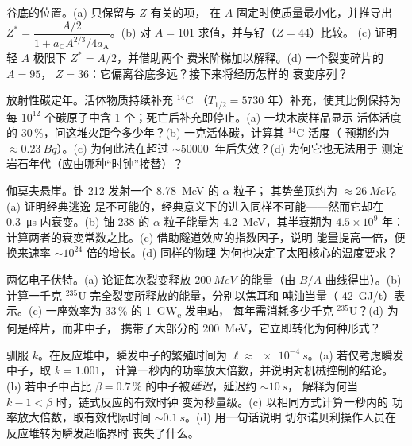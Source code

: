 \begin{exercise}[$\star\star$]\label{exo:b3:nuclear-physics:6}
谷底的位置。(a) 只保留与 $Z$ 有关的项，
在 $A$ 固定时使质量最小化，并推导出
$Z^* = \dfrac{A/2}{1 + a_{\text{C}}A^{2/3}/4a_{\text{A}}}$。(b)
对 $A = 101$ 求值，并与钌（$Z = 44$）比较。
(c) 证明轻 $A$ 极限下 $Z^* = A/2$，并借助两个
费米阶梯加以解释。(d) 一个裂变碎片的 $A = 95$，
$Z = 36$：它偏离谷底多远？接下来将经历怎样的
衰变序列？
\end{exercise}

\begin{exercise}[$\star\star$]\label{exo:b3:nuclear-physics:7}
放射性碳定年。活体物质持续补充 $^{14}$C
（$T_{1/2} = 5730$ 年）补充，使其比例保持为每 $10^{12}$
个碳原子中含 1 个；死亡后补充即停止。(a) 一块木炭样品显示
活体活度的 30\,\%，问这堆火距今多少年？(b) 一克活体碳，计算其
$^{14}$C 活度（
预期约为 $\approx\qty{0.23}{Bq}$）。(c) 为何此法在超过
$\sim\qty{50000}{}$ 年后失效？(d) 为何它也无法用于
测定岩石年代（应由哪种“时钟”接替）？
\end{exercise}

\begin{exercise}[$\star\star$]\label{exo:b3:nuclear-physics:8}
伽莫夫悬崖。钋-212 发射一个 \qty{8.78}{MeV} 的 $\alpha$ 粒子；
其势垒顶约为 $\approx\qty{26}{MeV}$。(a) 证明经典逃逸
是不可能的，经典意义下的进入同样不可能——然而它却在
\qty{0.3}{\micro s} 内衰变。(b) 铀-238 的 $\alpha$ 粒子能量为
\qty{4.2}{MeV}，其半衰期为 $4.5\times10^9$ 年：
计算两者的衰变常数之比。(c) 借助隧道效应的指数因子，说明
能量提高一倍，便换来速率
$\sim10^{24}$ 倍的增长。(d) 同样的物理
为何也决定了太阳核心的温度要求？
\end{exercise}

\begin{exercise}[$\star\star$]\label{exo:b3:nuclear-physics:9}
两亿电子伏特。(a) 论证每次裂变释放
$\qty{200}{MeV}$ 的能量（由 $B/A$ 曲线得出）。(b) 计算一千克 $^{235}$U
完全裂变所释放的能量，分别以焦耳和
吨油当量（
\qty{42}{GJ/t}）表示。(c) 一座效率为 33\,\% 的 \qty{1}{GW_e} 发电站，
每年需消耗多少千克 $^{235}$U？(d) 为何是碎片，而非中子，
携带了大部分的
\qty{200}{MeV}，它立即转化为何种形式？
\end{exercise}

\begin{exercise}[$\star\star\star$]\label{exo:b3:nuclear-physics:10}
驯服 $k$。在反应堆中，瞬发中子的繁殖时间为 $\ell
\approx \qty{e-4}{s}$。(a) 若仅考虑瞬发中子，取 $k = 1.001$，
计算一秒内的功率放大倍数，并说明对机械控制的结论。
(b) 若中子中占比 $\beta =
0.7\,\%$ 的中子被\emph{延迟}，延迟约 $\sim\qty{10}{s}$，
解释为何当 $k - 1 < \beta$ 时，链式反应的有效时钟
变为秒量级。(c) 以相同方式计算一秒内的
功率放大倍数，取有效代际时间 $\sim\qty{0.1}{s}$。(d) 用一句话说明
切尔诺贝利操作人员在反应堆转为瞬发超临界时
丧失了什么。
\end{exercise}

